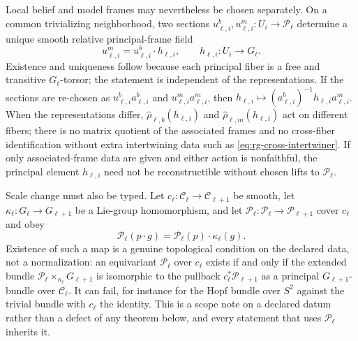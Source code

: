 Local belief and model frames may nevertheless be chosen separately. On a
common trivializing neighborhood, two sections
\(u^b_{\ell,i},u^m_{\ell,i}:U_i\to\mathscr P_\ell\) determine a unique smooth relative
principal-frame field
\begin{equation}
u^m_{\ell,i}=u^b_{\ell,i}\cdot h_{\ell,i},
\qquad h_{\ell,i}:U_i\to G_\ell.
\label{eq:rg-relative-frame}
\end{equation}
Existence and uniqueness follow because each principal fiber is a free and
transitive \(G_\ell\)-torsor; the statement is independent of the
representations. If the sections are
re-chosen as \(u^b_{\ell,i}a^b_{\ell,i}\) and
\(u^m_{\ell,i}a^m_{\ell,i}\), then
\(h_{\ell,i}\mapsto
(a^b_{\ell,i})^{-1}h_{\ell,i}a^m_{\ell,i}\). When the representations
differ, \(\widehat\rho_{\ell,b}(h_{\ell,i})\) and
\(\widehat\rho_{\ell,m}(h_{\ell,i})\) act on different fibers; there is no
matrix quotient of the associated frames and no cross-fiber identification
without extra intertwining data such as \eqref{eq:rg-cross-intertwiner}.
If only associated-frame data are given and either action is nonfaithful, the
principal element \(h_{\ell,i}\) need not be reconstructible without chosen
lifts to \(\mathscr P_\ell\).

Scale change must also be typed. Let
\(c_\ell:\mathcal C_\ell\to\mathcal C_{\ell+1}\) be smooth, let
\(\kappa_\ell:G_\ell\to G_{\ell+1}\) be a Lie-group homomorphism, and let
\(\mathcal P_\ell:\mathscr P_\ell\to\mathscr P_{\ell+1}\) cover \(c_\ell\) and obey
\begin{equation}
\mathcal P_\ell(p\cdot g)
=\mathcal P_\ell(p)\cdot\kappa_\ell(g).
\label{eq:rg-principal-scale-map}
\end{equation}
Existence of such a map is a genuine topological condition on the declared
data, not a normalization: an equivariant \(\mathcal P_\ell\) over \(c_\ell\)
exists if and only if the extended bundle
\(\mathscr P_\ell\times_{\kappa_\ell}G_{\ell+1}\) is isomorphic to the pullback
\(c_\ell^*\mathscr P_{\ell+1}\) as a principal \(G_{\ell+1}\)-bundle over
\(\mathcal C_\ell\).  It can fail, for instance for the Hopf bundle over
\(S^2\) against the trivial bundle with \(c_\ell\) the identity.  This is a
scope note on a declared datum rather than a defect of any theorem below, and
every statement that uses \(\mathcal P_\ell\) inherits it.

